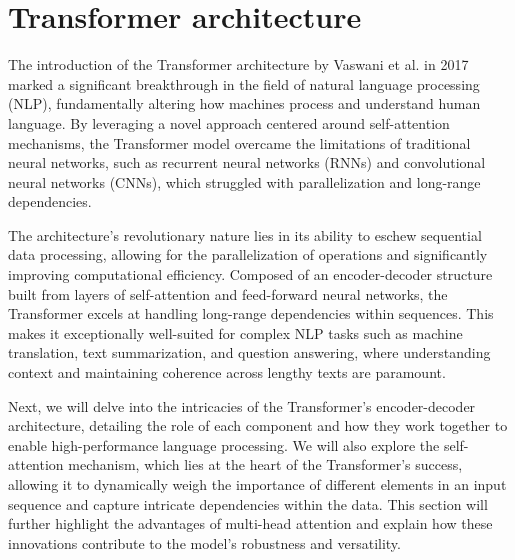 \section{Transformer architecture}

The introduction of the Transformer architecture by Vaswani et al. in 2017 marked a significant breakthrough in the field of natural language processing (NLP), fundamentally altering how machines process and understand human language. By leveraging a novel approach centered around self-attention mechanisms, the Transformer model overcame the limitations of traditional neural networks, such as recurrent neural networks (RNNs) and convolutional neural networks (CNNs), which struggled with parallelization and long-range dependencies.

The architecture's revolutionary nature lies in its ability to eschew sequential data processing, allowing for the parallelization of operations and significantly improving computational efficiency. Composed of an encoder-decoder structure built from layers of self-attention and feed-forward neural networks, the Transformer excels at handling long-range dependencies within sequences. This makes it exceptionally well-suited for complex NLP tasks such as machine translation, text summarization, and question answering, where understanding context and maintaining coherence across lengthy texts are paramount.

Next, we will delve into the intricacies of the Transformer's encoder-decoder architecture, detailing the role of each component and how they work together to enable high-performance language processing. We will also explore the self-attention mechanism, which lies at the heart of the Transformer's success, allowing it to dynamically weigh the importance of different elements in an input sequence and capture intricate dependencies within the data. This section will further highlight the advantages of multi-head attention and explain how these innovations contribute to the model's robustness and versatility.



